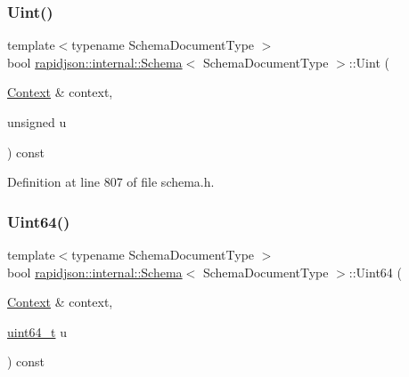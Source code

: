 \subsubsection{\texorpdfstring{Uint()}{Uint()}}
{\footnotesize\ttfamily template$<$typename Schema\+Document\+Type $>$ \\
bool \mbox{\hyperlink{classrapidjson_1_1internal_1_1_schema}{rapidjson\+::internal\+::\+Schema}}$<$ Schema\+Document\+Type $>$\+::Uint (\begin{DoxyParamCaption}\item[{\mbox{\hyperlink{classrapidjson_1_1internal_1_1_schema_afca06b1f51d1bc18403bdf3f4d55ffef}{Context}} \&}]{context,  }\item[{unsigned}]{u }\end{DoxyParamCaption}) const}



Definition at line 807 of file schema.\+h.


\begin{DoxyCode}{0}

\end{DoxyCode}
\mbox{\label{classrapidjson_1_1internal_1_1_schema_a0dbf7bd40c28def6988d5e35f61f17a7}} 
\subsubsection{\texorpdfstring{Uint64()}{Uint64()}}
{\footnotesize\ttfamily template$<$typename Schema\+Document\+Type $>$ \\
bool \mbox{\hyperlink{classrapidjson_1_1internal_1_1_schema}{rapidjson\+::internal\+::\+Schema}}$<$ Schema\+Document\+Type $>$\+::Uint64 (\begin{DoxyParamCaption}\item[{\mbox{\hyperlink{classrapidjson_1_1internal_1_1_schema_afca06b1f51d1bc18403bdf3f4d55ffef}{Context}} \&}]{context,  }\item[{\mbox{\hyperlink{stdint_8h_aec6fcb673ff035718c238c8c9d544c47}{uint64\+\_\+t}}}]{u }\end{DoxyParamCaption}) const}



